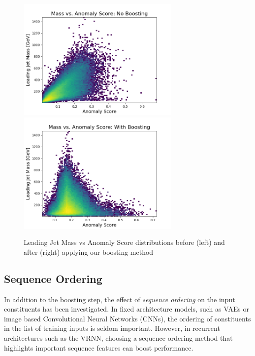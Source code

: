 \documentclass[12pt, a4paper]{article}
\begin{document}
\begin{figure}[H]
	\begin{center}
		\includegraphics[width=225pt]{imgs/ProcNoBoostPt_Background_July20_Background_July20_Weights_Leading_ConstOnly_Avg_M_vs_Score_ProcTest_SaveForPaper.png}
		\includegraphics[width=225pt]{imgs/ProcBoostPt_Background_July20_Background_July20_Weights_Leading_ConstOnly_Avg_M_vs_Score_ProcTest_SaveForPaper.png}
	\end{center}
	\caption{Leading Jet Mass vs Anomaly Score distributions before (left) and after (right) applying our boosting method}
	\label{fig:mass_vs_score_boost}
\end{figure}


\subsection{Sequence Ordering}

In addition to the boosting step, the effect of \textit{sequence ordering} on the input constituents has been investigated. In fixed architecture models, such as VAEs or image based Convolutional Neural Networks (CNNs), the ordering of constituents in the list of training inputs is seldom important. However, in recurrent architectures such as the VRNN, choosing a sequence ordering method that highlights important sequence features can boost performance.
 
\end{document}
